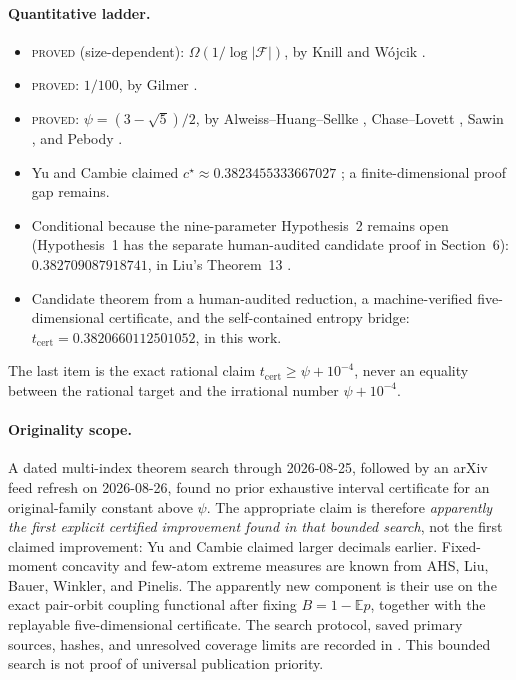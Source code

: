 \documentclass[11pt]{article}
\theoremstyle{plain}
\theoremstyle{definition}
\theoremstyle{remark}
\newcommand{\PROVED}{\textsc{proved}}
\begin{document}
\paragraph{Quantitative ladder.}
\begin{itemize}
\item \PROVED{} (size-dependent):
$\Omega(1/\log|\mathcal F|)$, by Knill \cite{knill} and W\'ojcik
\cite{wojcik}.
\item \PROVED{}:
$1/100$, by Gilmer \cite{gilmer}.
\item \PROVED{}:
$\psi=(3-\sqrt5)/2$, by Alweiss--Huang--Sellke \cite{ahs},
Chase--Lovett \cite{chaselovett}, Sawin \cite{sawin}, and Pebody
\cite{pebody}.
\item Yu and Cambie claimed
$c^\star\approx0.3823455333667027$ \cite{yu,cambie};
a finite-dimensional proof gap remains.
\item Conditional because the nine-parameter Hypothesis~2 remains open
(Hypothesis~1 has the separate human-audited candidate proof in Section~6):
$0.382709087918741$, in Liu's Theorem~13 \cite{liu}.
\item Candidate theorem from a human-audited reduction, a machine-verified
five-dimensional certificate, and the self-contained entropy bridge:
$t_{\mathrm{cert}}=0.3820660112501052$, in this work.
\end{itemize}
The last item is the exact rational claim
$t_{\mathrm{cert}}\ge\psi+10^{-4}$, never an equality between the rational
target and the irrational number $\psi+10^{-4}$.

\paragraph{Originality scope.}
A dated multi-index theorem search through 2026-08-25, followed by an arXiv
feed refresh on 2026-08-26, found no prior exhaustive interval certificate for
an original-family constant above \(\psi\).  The
appropriate claim is therefore \emph{apparently the first explicit certified
improvement found in that bounded search}, not the first claimed improvement:
Yu and Cambie claimed larger decimals earlier.  Fixed-moment concavity and
few-atom extreme measures are known from AHS, Liu, Bauer, Winkler, and
Pinelis.  The apparently new component is their use on the exact pair-orbit
coupling functional after fixing \(B=1-\mathbb Ep\), together with the
replayable five-dimensional certificate.  The search protocol, saved primary
sources, hashes, and unresolved coverage limits are recorded in
.  This bounded search is not proof of
universal publication priority.
\end{document}
